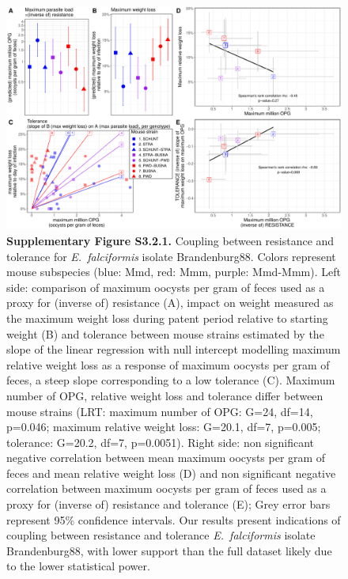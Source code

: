 \begin{figure}[H]
	\centering
	\includegraphics[width=\linewidth,height=\textheight,keepaspectratio]{images/3article2/SupplFig5.pdf}
	\captionsetup{labelformat=empty}
	\caption{\textbf{Supplementary Figure S3.2.1.} Coupling between resistance and tolerance for \textit{E.~falciformis} isolate Brandenburg88. Colors represent mouse subspecies (blue: Mmd, red: Mmm, purple: Mmd-Mmm). Left side: comparison of maximum oocysts per gram of feces used as a proxy for (inverse of) resistance (A), impact on weight measured as the maximum weight loss during patent period relative to starting weight (B) and tolerance between mouse strains estimated by the slope of the linear regression with null intercept modelling maximum relative weight loss as a response of maximum oocysts per gram of feces, a steep slope corresponding to a low tolerance (C). Maximum number of OPG, relative weight loss and tolerance differ between mouse strains (LRT: maximum number of OPG: G=24, df=14, p=0.046; maximum relative weight loss: G=20.1, df=7, p=0.005; tolerance: G=20.2, df=7, p=0.0051). Right side: non significant negative correlation between mean maximum oocysts per gram of feces and mean relative weight loss (D) and non significant negative correlation between maximum oocysts per gram of feces used as a proxy for (inverse of) resistance and tolerance (E); Grey error bars represent 95\% confidence intervals. Our results present indications of coupling between resistance and tolerance \textit{E.~falciformis} isolate Brandenburg88, with lower support than the full dataset likely due to the lower statistical power.}
\end{figure}


